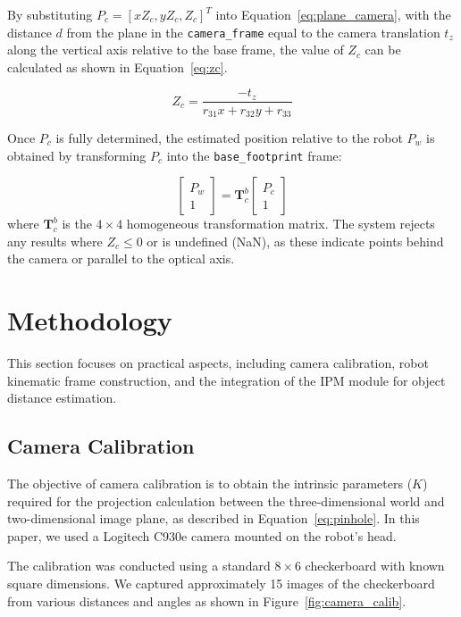 \documentclass[journal]{IAENGtran}
\begin{document}
By substituting $P_c = [x Z_c, y Z_c, Z_c]^T$ into Equation~\ref{eq:plane_camera}, with
the distance $d$ from the plane in the \texttt{camera\_frame} equal to
the camera translation $t_z$ along the vertical axis relative to the base frame,
the value of $Z_c$ can be calculated as shown in Equation~\ref{eq:zc}.

\begin{equation} \label{eq:zc}
Z_c = \frac{-t_z}{r_{31} x + r_{32} y + r_{33}}
\end{equation}

Once $P_c$ is fully determined, the estimated position relative to the robot $P_w$
is obtained by transforming $P_c$ into the \texttt{base\_footprint} frame:

\begin{equation}
\begin{bmatrix} P_w \\ 1 \end{bmatrix} = \mathbf{T}_{c}^{b} \begin{bmatrix} P_c \\ 1 \end{bmatrix}
\end{equation}
where $\mathbf{T}_{c}^{b}$ is the $4 \times 4$ homogeneous transformation matrix.
The system rejects any results where $Z_c \leq 0$ or is undefined (NaN),
as these indicate points behind the camera or parallel to the optical axis.

\section{Methodology}

This section focuses on practical aspects, including camera calibration,
robot kinematic frame construction, and the integration of the IPM module for object distance estimation.

\subsection{Camera Calibration}
The objective of camera calibration is to obtain the intrinsic parameters ($K$)
required for the projection calculation between the three-dimensional world and two-dimensional
image plane, as described in Equation~\ref{eq:pinhole}. In this paper, we used a Logitech C930e camera mounted
on the robot's head.

The calibration was conducted using a standard $8 \times 6$ checkerboard with known
square dimensions. We captured approximately 15 images of the checkerboard from
various distances and angles as shown in Figure~\ref{fig:camera_calib}.
\end{document}
